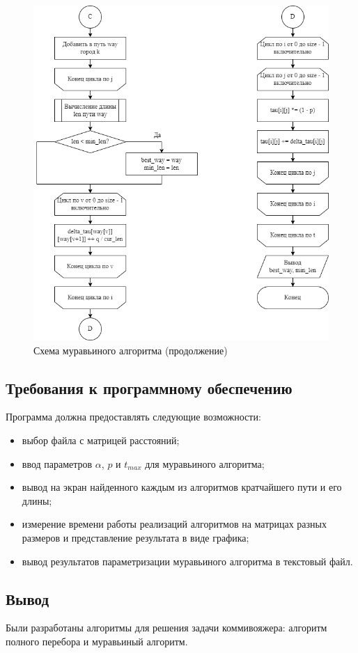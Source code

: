 \begin{figure}[h!btp]
	\centering
	\includegraphics[width=400pt]{inc/scheme_ant_alg_3.png}
	\caption{Схема муравьиного алгоритма (продолжение)}
	\label{fig:ant3}	
\end{figure}

\vspace{\baselineskip}
\subsection{Требования к программному обеспечению}
\vspace{\baselineskip}

Программа должна предоставлять следующие возможности:
\begin{itemize}[label=---]
    \item выбор файла с матрицей расстояний;
    \item ввод параметров $\alpha$, $p$ и $t_{max}$ для муравьиного алгоритма;
    \item вывод на экран найденного каждым из алгоритмов кратчайшего пути и его длины;
    \item измерение времени работы реализаций алгоритмов на матрицах разных размеров и представление результата в виде графика;
    \item вывод результатов параметризации муравьиного алгоритма в текстовый файл.
\end{itemize}

\vspace{\baselineskip}
\subsection*{Вывод}
\vspace{\baselineskip}

Были разработаны алгоритмы для решения задачи коммивояжера: алгоритм полного перебора и муравьиный алгоритм.
